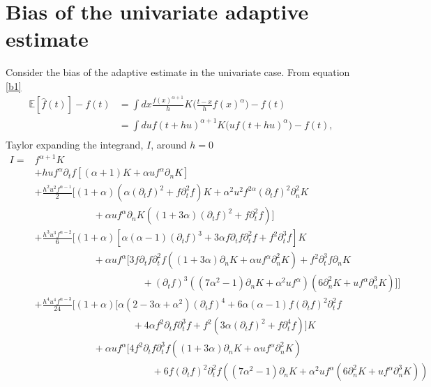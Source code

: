 \chapter{Bias of the univariate adaptive estimate}
\label{app1}
Consider the bias of the adaptive estimate in the univariate case. From equation \eqref{b1}
\begin{equation}
	\begin{split}
		\mathbb{E}[\hat{f}(t)]-f(t)&=\int dx \frac{f(x)^{\alpha+1}}{h} K\bigg(\frac{t-x}{h}f(x)^\alpha\bigg)-f(t)\\
		&=\int du f(t+hu)^{\alpha+1} K\bigg(uf(t+hu)^\alpha\bigg)-f(t),\\
	\end{split}
\end{equation}
Taylor expanding the integrand, $I$, around $h=0$
\begin{equation}
	\begin{split}
		I=&f^{\alpha+1}K\\
		&+huf^\alpha\partial_tf[(\alpha+1)K+\alpha u f^\alpha\partial_nK]\\
		&+\frac{h^2u^2f^{\alpha-1}}{2}[(1+\alpha)(\alpha(\partial_tf)^2+f\partial_t^2f)K+\alpha^2u^2f^{2\alpha}(\partial_tf)^2 \partial_n^2K\\
		&\qquad\qquad\qquad+\alpha u  f^\alpha\partial_nK((1+3\alpha )(\partial_tf)^2+f\partial_t^2f)]\\
		&+\frac{h^3u^3f^{\alpha-2}}{6}\bigg[(1+\alpha)[\alpha(\alpha-1)(\partial_tf)^3+3\alpha f\partial_t f\partial_t^2 f+f^2\partial_t^3f]K\\
		&\qquad\qquad\qquad+\alpha u f^\alpha [3f\partial_tf\partial_t^2f((1+3\alpha)\partial_nK+\alpha u f^\alpha \partial_n^2K)+f^2\partial_t^3f\partial_nK\\
		&\qquad\qquad\qquad\qquad\qquad\quad+(\partial_tf)^3((7\alpha^2-1)\partial_nK+\alpha^2uf^\alpha )(6\partial_n^2K+uf^\alpha \partial_n^3K)]\bigg]\\
		&+\frac{h^4u^4f^{\alpha-3}}{24}\bigg[(1+\alpha)[\alpha(2-3\alpha+\alpha^2)(\partial_t f)^4+6\alpha(\alpha-1)f(\partial_t f)^2\partial_t ^2f\\
		&\qquad\qquad\qquad\qquad\qquad+4\alpha f^2\partial_t f\partial_t^3f+f^2(3\alpha(\partial_tf)^2+f\partial_t^4f)]K\\
		&\qquad\qquad\qquad +\alpha uf^\alpha [4f^2\partial_tf\partial_t^3f((1+3\alpha)\partial_nK+\alpha uf^\alpha \partial_n^2K)\\
		&\qquad\qquad\qquad\qquad\qquad\qquad+6f(\partial_tf)^2\partial_t^2f((7\alpha^2-1)\partial_nK+\alpha^2uf^\alpha (6\partial_n^2K +uf^\alpha \partial_n^3K))\\

\end{split}
\end{equation}
